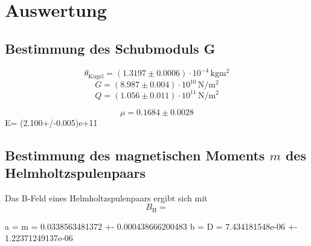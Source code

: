 \section{Auswertung}
\label{sec:Auswertung}
\subsection{Bestimmung des Schubmoduls G}
\begin{equation}
	\theta_{\mathrm{Kugel}}=(1.3197\pm 0.0006) \cdot 10^{-4} \,\si{\kilo\gram \square\metre}
\end{equation}
\begin{equation}
	G= (8.987\pm 0.004) \cdot 10^{10}  \,\si{\newton \per \square\metre}
\end{equation}
\begin{equation}
	Q= (1.056\pm 0.011) \cdot 10^{11}  \,\si{\newton \per \square\metre}
\end{equation}

\begin{equation}
	\mu= 0.1684\pm 0.0028
\end{equation}
E= (2.100+/-0.005)e+11
\subsection{Bestimmung des magnetischen Moments $m$ des Helmholtzspulenpaars}
Das B-Feld eines Helmholtzspulenpaars ergibt sich mit
\begin{equation}
	B_{\mathrm{H}}=
\end{equation}



a = m = 0.0338563481372 +- 0.000438666200483
b = D =  7.434181548e-06 +- 1.22371249137e-06
